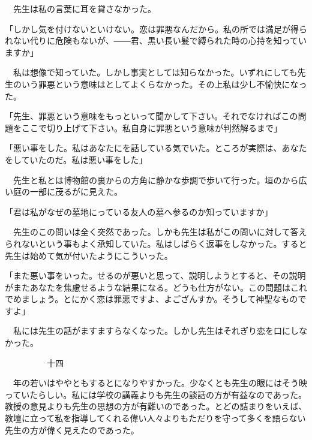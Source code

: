 \documentclass[a4j,onecolumn]{tarticle}
\begin{document}
　先生は私の言葉に耳を貸さなかった。\hbox{}\par{}
「しかし気を付けないといけない。\hbox{}恋は罪悪なんだから。\hbox{}私の所では満足が得られない代りに危険もないが、\hbox{}――君、\hbox{}黒い長い髪で縛られた時の心持を知っていますか」\par{}
　私は想像で知っていた。\hbox{}しかし事実としては知らなかった。\hbox{}いずれにしても先生のいう罪悪という意味はとしてよくらなかった。\hbox{}その上私は少し不愉快になった。\hbox{}\par{}
「先生、\hbox{}罪悪という意味をもっといって聞かして下さい。\hbox{}それでなければこの問題をここで切り上げて下さい。\hbox{}私自身に罪悪という意味が判然解るまで」\par{}
「悪い事をした。\hbox{}私はあなたにを話している気でいた。\hbox{}ところが実際は、\hbox{}あなたをしていたのだ。\hbox{}私は悪い事をした」\par{}
　先生と私とは博物館の裏からの方角に静かな歩調で歩いて行った。\hbox{}垣のから広い庭の一部に茂るがに見えた。\hbox{}\par{}
「君は私がなぜの墓地にっている友人の墓へ参るのか知っていますか」\par{}
　先生のこの問いは全く突然であった。\hbox{}しかも先生は私がこの問いに対して答えられないという事もよく承知していた。\hbox{}私はしばらく返事をしなかった。\hbox{}すると先生は始めて気が付いたようにこういった。\hbox{}\par{}
「また悪い事をいった。\hbox{}せるのが悪いと思って、\hbox{}説明しようとすると、\hbox{}その説明がまたあなたを焦慮せるような結果になる。\hbox{}どうも仕方がない。\hbox{}この問題はこれでめましょう。\hbox{}とにかく恋は罪悪ですよ、\hbox{}よござんすか。\hbox{}そうして神聖なものですよ」\par{}
　私には先生の話がますますらなくなった。\hbox{}しかし先生はそれぎり恋を口にしなかった。\hbox{}\par{}\par{}　　　　　十四
\par{}
　年の若いはややともするとになりやすかった。\hbox{}少なくとも先生の眼にはそう映っていたらしい。\hbox{}私には学校の講義よりも先生の談話の方が有益なのであった。\hbox{}教授の意見よりも先生の思想の方が有難いのであった。\hbox{}とどの詰まりをいえば、\hbox{}教壇に立って私を指導してくれる偉い人々よりもただりを守って多くを語らない先生の方が偉く見えたのであった。\hbox{}\par{}
\end{document}
